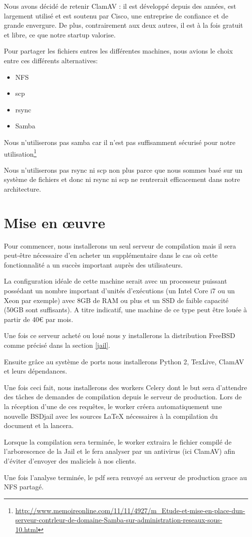 \documentclass[10pt,a4paper]{article}
\begin{document}
Nous avons décidé de retenir ClamAV : il est développé depuis des années, est largement utilisé et est soutenu par Cisco, une entreprise de confiance et de grande envergure. De plus, contrairement aux deux autres, il est à la fois gratuit et libre, ce que notre startup valorise.

Pour partager les fichiers entres les différentes machines, nous avions le choix entre ces différents alternatives:
\begin{itemize}
    \item{NFS}
    \item{scp}
    \item{rsync}
    \item{Samba}
\end{itemize}

Nous n'utiliserons pas samba car il n'est pas suffisamment sécurisé pour notre utilisation\footnote{\url{http://www.memoireonline.com/11/11/4927/m_Etude-et-mise-en-place-dun-serveur-contrleur-de-domaine-Samba-sur-administration-reseaux-sous-10.html}}

Nous n'utiliserons pas rsync ni scp non plus parce que nous sommes basé sur un système de fichiers et donc ni rsync ni scp ne rentrerait efficacement dans notre architecture.

\section{Mise en œuvre}

Pour commencer, nous installerons un seul serveur de compilation mais il sera peut-être nécessaire d'en acheter un supplémentaire dans le cas où cette fonctionnalité a un succès important auprès des utilisateurs.

La configuration idéale de cette machine serait avec un processeur puissant possédant un nombre important d'unités d'exécutions (un Intel Core i7 ou un Xeon par exemple) avec 8GB de RAM ou plus et un SSD de faible capacité (50GB sont suffisants).
A titre indicatif, une machine de ce type peut être louée à partir de 40\euro { }par mois.


Une fois ce serveur acheté ou loué nous y installerons la distribution FreeBSD comme précisé dans la section \ref{jail}.

Ensuite grâce au système de ports nous installerons Python 2, TexLive, ClamAV et leurs dépendances.


Une fois ceci fait, nous installerons des workers Celery dont le but sera d'attendre des tâches de demandes de compilation depuis le serveur de production.
Lors de la réception d'une de ces requêtes, le worker créera automatiquement une nouvelle BSDjail avec les sources \LaTeX { }nécessaires à la compilation du document et la lancera.

Lorsque la compilation sera terminée, le worker extraira le fichier compilé de l'arborescence de la Jail et le fera analyser par un antivirus (ici ClamAV) afin d'éviter d'envoyer des maliciels à nos clients.

Une fois l'analyse terminée, le pdf sera renvoyé au serveur de production grace au NFS partagé.
\end{document}
